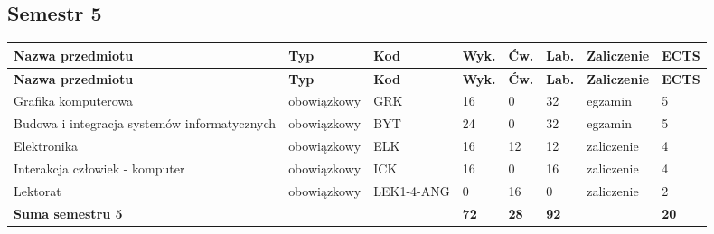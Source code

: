 \documentclass[12pt,a4paper]{article}
\newcommand{\thdrule}{\noalign{\global\setlength{\extrarowheight}{0pt}}}
\newcommand{\thdend}{\noalign{\global\setlength{\extrarowheight}{4pt}}}
\begin{document}
\clearpage
\subsection*{Semestr 5}

{\scriptsize
\begin{longtable}{>{\RaggedRight}m{5.0cm}m{1.9cm}m{0.75cm}m{0.85cm}m{0.85cm}m{0.85cm}m{1.45cm}m{0.9cm}}
\thdrule\toprule
\rowcolor{pjatkRed}
{\color{white}\footnotesize\textbf{\vphantom{Ag}Nazwa przedmiotu}} & {\color{white}\footnotesize\textbf{\vphantom{Ag}Typ}} & {\color{white}\footnotesize\textbf{\vphantom{Ag}Kod}} & {\color{white}\footnotesize\textbf{\vphantom{Ag}Wyk.}} & {\color{white}\footnotesize\textbf{\vphantom{Ag}Ćw.}} & {\color{white}\footnotesize\textbf{\vphantom{Ag}Lab.}} & {\color{white}\footnotesize\textbf{\vphantom{Ag}Zaliczenie}} & {\color{white}\footnotesize\textbf{\vphantom{Ag}ECTS}} \\
\midrule\thdend
\endfirsthead
\thdrule\toprule
\rowcolor{pjatkRed}
{\color{white}\footnotesize\textbf{\vphantom{Ag}Nazwa przedmiotu}} & {\color{white}\footnotesize\textbf{\vphantom{Ag}Typ}} & {\color{white}\footnotesize\textbf{\vphantom{Ag}Kod}} & {\color{white}\footnotesize\textbf{\vphantom{Ag}Wyk.}} & {\color{white}\footnotesize\textbf{\vphantom{Ag}Ćw.}} & {\color{white}\footnotesize\textbf{\vphantom{Ag}Lab.}} & {\color{white}\footnotesize\textbf{\vphantom{Ag}Zaliczenie}} & {\color{white}\footnotesize\textbf{\vphantom{Ag}ECTS}} \\
\midrule\thdend
\endhead
\rowcolor{tableRowLight} Grafika komputerowa & {\scriptsize obowiązkowy} & GRK & 16 & 0 & 32 & {\scriptsize egzamin} & 5 \\
\rowcolor{tableRowAlt} Budowa i integracja systemów informatycznych & {\scriptsize obowiązkowy} & BYT & 24 & 0 & 32 & {\scriptsize egzamin} & 5 \\
\rowcolor{tableRowLight} Elektronika & {\scriptsize obowiązkowy} & ELK & 16 & 12 & 12 & {\scriptsize zaliczenie} & 4 \\
\rowcolor{tableRowAlt} Interakcja człowiek - komputer & {\scriptsize obowiązkowy} & ICK & 16 & 0 & 16 & {\scriptsize zaliczenie} & 4 \\
\rowcolor{tableRowLight} Lektorat & {\scriptsize obowiązkowy} & LEK1-4-ANG & 0 & 16 & 0 & {\scriptsize zaliczenie} & 2 \\
\midrule[\heavyrulewidth]
\rowcolor{tableSummary} \textbf{Suma semestru 5} & & & \textbf{72} & \textbf{28} & \textbf{92} & & \textbf{20} \\
\bottomrule
\end{longtable}}
\end{document}
